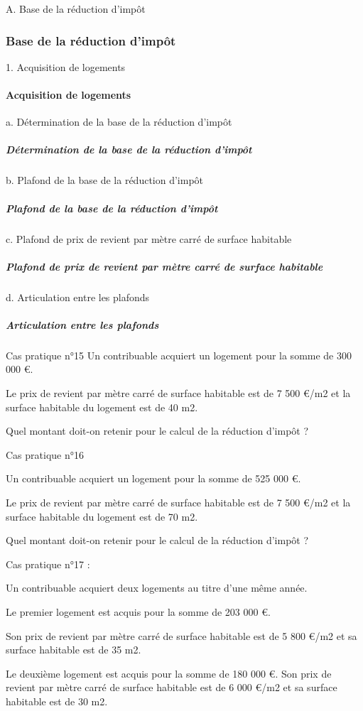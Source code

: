 A. Base de la réduction d'impôt
		\subsubsection{Base de la réduction d'impôt}


1. Acquisition de logements
				\paragraph{Acquisition de logements}

a. Détermination de la base de la réduction d'impôt
					\subparagraph{Détermination de la base de la réduction d'impôt}

b. Plafond de la base de la réduction d'impôt
					\subparagraph{Plafond de la base de la réduction d'impôt}

c. Plafond de prix de revient par mètre carré de surface habitable
					\subparagraph{Plafond de prix de revient par mètre carré de surface habitable}

d. Articulation entre les plafonds
					\subparagraph{Articulation entre les plafonds}


Cas pratique n°15
Un contribuable acquiert un logement pour la somme de 300 000 €.

Le prix de revient par mètre carré de surface habitable est de 7 500 €/m2 et la surface habitable du logement est de 40 m2.

Quel montant doit-on retenir pour le calcul de la réduction d’impôt ?

Cas pratique n°16

Un contribuable acquiert un logement pour la somme de 525 000 €.

Le prix de revient par mètre carré de surface habitable est de 7 500 €/m2 et la surface habitable du logement est de 70 m2.

Quel montant doit-on retenir pour le calcul de la réduction d’impôt ?

Cas pratique n°17 :

Un contribuable acquiert deux logements au titre d'une même année.

Le premier logement est acquis pour la somme de 203 000 €.

Son prix de revient par mètre carré de surface habitable est de 5 800 €/m2 et sa surface habitable est de 35 m2.

Le deuxième logement est acquis pour la somme de 180 000 €. Son prix de revient par mètre carré de surface habitable est de 6 000 €/m2 et sa surface habitable est de 30 m2.

